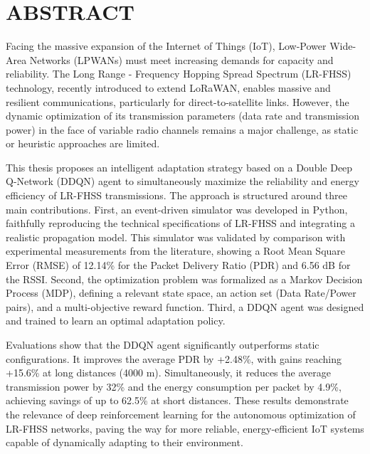 \documentclass[a4paper,12pt]{report}
\begin{document}
	
	\newpage
	\section*{\centering ABSTRACT}

	Facing the massive expansion of the Internet of Things (IoT), Low-Power Wide-Area Networks (LPWANs) must meet increasing demands for capacity and reliability. The Long Range - Frequency Hopping Spread Spectrum (LR-FHSS) technology, recently introduced to extend LoRaWAN, enables massive and resilient communications, particularly for direct-to-satellite links. However, the dynamic optimization of its transmission parameters (data rate and transmission power) in the face of variable radio channels remains a major challenge, as static or heuristic approaches are limited.

	This thesis proposes an intelligent adaptation strategy based on a Double Deep Q-Network (DDQN) agent to simultaneously maximize the reliability and energy efficiency of LR-FHSS transmissions. The approach is structured around three main contributions. First, an event-driven simulator was developed in Python, faithfully reproducing the technical specifications of LR-FHSS and integrating a realistic propagation model. This simulator was validated by comparison with experimental measurements from the literature, showing a Root Mean Square Error (RMSE) of 12.14\% for the Packet Delivery Ratio (PDR) and 6.56 dB for the RSSI. Second, the optimization problem was formalized as a Markov Decision Process (MDP), defining a relevant state space, an action set (Data Rate/Power pairs), and a multi-objective reward function. Third, a DDQN agent was designed and trained to learn an optimal adaptation policy.

	Evaluations show that the DDQN agent significantly outperforms static configurations. It improves the average PDR by +2.48\%, with gains reaching +15.6\% at long distances (4000 m). Simultaneously, it reduces the average transmission power by 32\% and the energy consumption per packet by 4.9\%, achieving savings of up to 62.5\% at short distances. These results demonstrate the relevance of deep reinforcement learning for the autonomous optimization of LR-FHSS networks, paving the way for more reliable, energy-efficient IoT systems capable of dynamically adapting to their environment.

	\newpage
	\cleardoublepage
	\renewcommand{\contentsname}{SOMMAIRE} %
	\tableofcontents
	\newpage
	
\end{document}

